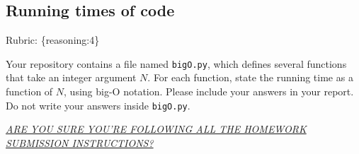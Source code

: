 \documentclass{article}
\def\rubric#1{\gre{Rubric: \{#1\}}}{}
\def\blu#1{{\color{blu}#1}}
\def\gre#1{{\color{gre}#1}}
\begin{document}
\subsection{Running times of code}
\rubric{reasoning:4}

Your repository contains a file named \texttt{bigO.py}, which defines several functions
that take an integer argument $N$. For each function, \blu{state the running time as a function of $N$, using big-O notation}.
Please include your answers in your report. Do not write your answers inside \texttt{bigO.py}.

\vspace{50pt}
\underline{\emph{ARE YOU SURE YOU'RE FOLLOWING ALL THE HOMEWORK SUBMISSION INSTRUCTIONS?}}
\end{document}
